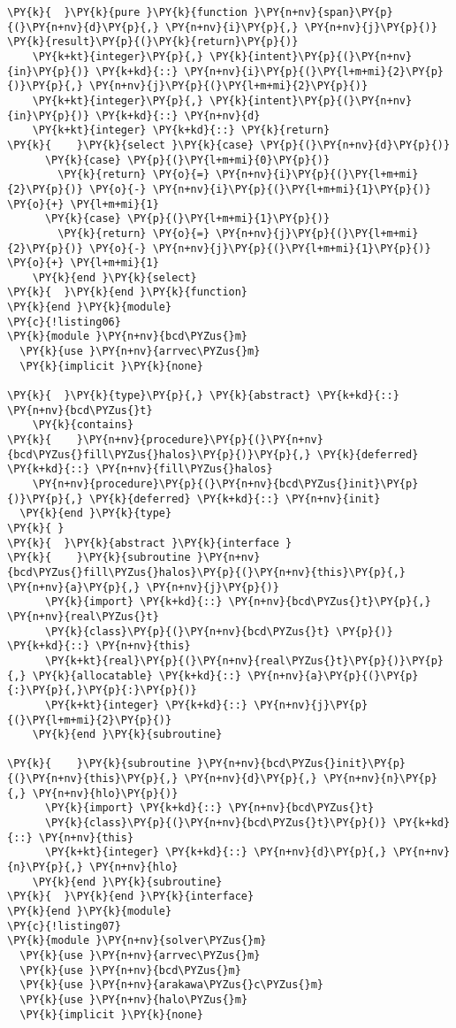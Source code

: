 \begin{Verbatim}[commandchars=\\\{\}]
\PY{k}{  }\PY{k}{pure }\PY{k}{function }\PY{n+nv}{span}\PY{p}{(}\PY{n+nv}{d}\PY{p}{,} \PY{n+nv}{i}\PY{p}{,} \PY{n+nv}{j}\PY{p}{)} \PY{k}{result}\PY{p}{(}\PY{k}{return}\PY{p}{)}
    \PY{k+kt}{integer}\PY{p}{,} \PY{k}{intent}\PY{p}{(}\PY{n+nv}{in}\PY{p}{)} \PY{k+kd}{::} \PY{n+nv}{i}\PY{p}{(}\PY{l+m+mi}{2}\PY{p}{)}\PY{p}{,} \PY{n+nv}{j}\PY{p}{(}\PY{l+m+mi}{2}\PY{p}{)}
    \PY{k+kt}{integer}\PY{p}{,} \PY{k}{intent}\PY{p}{(}\PY{n+nv}{in}\PY{p}{)} \PY{k+kd}{::} \PY{n+nv}{d}
    \PY{k+kt}{integer} \PY{k+kd}{::} \PY{k}{return}
\PY{k}{    }\PY{k}{select }\PY{k}{case} \PY{p}{(}\PY{n+nv}{d}\PY{p}{)}
      \PY{k}{case} \PY{p}{(}\PY{l+m+mi}{0}\PY{p}{)}
        \PY{k}{return} \PY{o}{=} \PY{n+nv}{i}\PY{p}{(}\PY{l+m+mi}{2}\PY{p}{)} \PY{o}{-} \PY{n+nv}{i}\PY{p}{(}\PY{l+m+mi}{1}\PY{p}{)} \PY{o}{+} \PY{l+m+mi}{1}
      \PY{k}{case} \PY{p}{(}\PY{l+m+mi}{1}\PY{p}{)}
        \PY{k}{return} \PY{o}{=} \PY{n+nv}{j}\PY{p}{(}\PY{l+m+mi}{2}\PY{p}{)} \PY{o}{-} \PY{n+nv}{j}\PY{p}{(}\PY{l+m+mi}{1}\PY{p}{)} \PY{o}{+} \PY{l+m+mi}{1}
    \PY{k}{end }\PY{k}{select}
\PY{k}{  }\PY{k}{end }\PY{k}{function}
\PY{k}{end }\PY{k}{module}
\PY{c}{!listing06}
\PY{k}{module }\PY{n+nv}{bcd\PYZus{}m}
  \PY{k}{use }\PY{n+nv}{arrvec\PYZus{}m}
  \PY{k}{implicit }\PY{k}{none}

\PY{k}{  }\PY{k}{type}\PY{p}{,} \PY{k}{abstract} \PY{k+kd}{::} \PY{n+nv}{bcd\PYZus{}t}
    \PY{k}{contains}
\PY{k}{    }\PY{n+nv}{procedure}\PY{p}{(}\PY{n+nv}{bcd\PYZus{}fill\PYZus{}halos}\PY{p}{)}\PY{p}{,} \PY{k}{deferred} \PY{k+kd}{::} \PY{n+nv}{fill\PYZus{}halos}
    \PY{n+nv}{procedure}\PY{p}{(}\PY{n+nv}{bcd\PYZus{}init}\PY{p}{)}\PY{p}{,} \PY{k}{deferred} \PY{k+kd}{::} \PY{n+nv}{init}
  \PY{k}{end }\PY{k}{type}
\PY{k}{ }
\PY{k}{  }\PY{k}{abstract }\PY{k}{interface }
\PY{k}{    }\PY{k}{subroutine }\PY{n+nv}{bcd\PYZus{}fill\PYZus{}halos}\PY{p}{(}\PY{n+nv}{this}\PY{p}{,} \PY{n+nv}{a}\PY{p}{,} \PY{n+nv}{j}\PY{p}{)}
      \PY{k}{import} \PY{k+kd}{::} \PY{n+nv}{bcd\PYZus{}t}\PY{p}{,} \PY{n+nv}{real\PYZus{}t}
      \PY{k}{class}\PY{p}{(}\PY{n+nv}{bcd\PYZus{}t} \PY{p}{)} \PY{k+kd}{::} \PY{n+nv}{this}
      \PY{k+kt}{real}\PY{p}{(}\PY{n+nv}{real\PYZus{}t}\PY{p}{)}\PY{p}{,} \PY{k}{allocatable} \PY{k+kd}{::} \PY{n+nv}{a}\PY{p}{(}\PY{p}{:}\PY{p}{,}\PY{p}{:}\PY{p}{)} 
      \PY{k+kt}{integer} \PY{k+kd}{::} \PY{n+nv}{j}\PY{p}{(}\PY{l+m+mi}{2}\PY{p}{)}
    \PY{k}{end }\PY{k}{subroutine}

\PY{k}{    }\PY{k}{subroutine }\PY{n+nv}{bcd\PYZus{}init}\PY{p}{(}\PY{n+nv}{this}\PY{p}{,} \PY{n+nv}{d}\PY{p}{,} \PY{n+nv}{n}\PY{p}{,} \PY{n+nv}{hlo}\PY{p}{)}
      \PY{k}{import} \PY{k+kd}{::} \PY{n+nv}{bcd\PYZus{}t}
      \PY{k}{class}\PY{p}{(}\PY{n+nv}{bcd\PYZus{}t}\PY{p}{)} \PY{k+kd}{::} \PY{n+nv}{this}
      \PY{k+kt}{integer} \PY{k+kd}{::} \PY{n+nv}{d}\PY{p}{,} \PY{n+nv}{n}\PY{p}{,} \PY{n+nv}{hlo}
    \PY{k}{end }\PY{k}{subroutine}
\PY{k}{  }\PY{k}{end }\PY{k}{interface}
\PY{k}{end }\PY{k}{module}
\PY{c}{!listing07}
\PY{k}{module }\PY{n+nv}{solver\PYZus{}m}
  \PY{k}{use }\PY{n+nv}{arrvec\PYZus{}m}
  \PY{k}{use }\PY{n+nv}{bcd\PYZus{}m}
  \PY{k}{use }\PY{n+nv}{arakawa\PYZus{}c\PYZus{}m}
  \PY{k}{use }\PY{n+nv}{halo\PYZus{}m}
  \PY{k}{implicit }\PY{k}{none}


\end{Verbatim}

